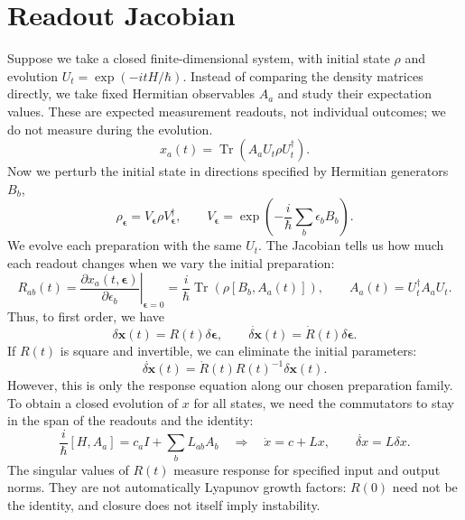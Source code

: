 \documentclass[11pt,a4paper]{article}
\newcommand{\Tr}{\operatorname{Tr}}
\begin{document}
\section*{Readout Jacobian}
Suppose we take a closed finite-dimensional system, with initial state $\rho$ and evolution $U_t=\exp(-itH/\hbar)$. Instead of comparing the density matrices directly, we take fixed Hermitian observables $A_a$ and study their expectation values. These are expected measurement readouts, not individual outcomes; we do not measure during the evolution.
\[x_a(t)=\Tr(A_aU_t\rho U_t^\dagger).\]
Now we perturb the initial state in directions specified by Hermitian generators $B_b$,
\[\rho_{\boldsymbol\epsilon}=V_{\boldsymbol\epsilon}\rho V_{\boldsymbol\epsilon}^\dagger,\qquad V_{\boldsymbol\epsilon}=\exp\!\left(-\frac{i}{\hbar}\sum_b\epsilon_bB_b\right).\]
We evolve each preparation with the same $U_t$. The Jacobian tells us how much each readout changes when we vary the initial preparation:
\[R_{ab}(t)=\left.\frac{\partial x_a(t,\boldsymbol\epsilon)}{\partial\epsilon_b}\right|_{\boldsymbol\epsilon=0}=\frac{i}{\hbar}\Tr(\rho[B_b,A_a(t)]),\qquad A_a(t)=U_t^\dagger A_aU_t.\]
Thus, to first order, we have
\[\delta\boldsymbol x(t)=R(t)\delta\boldsymbol\epsilon,\qquad\dot{\delta\boldsymbol x}(t)=\dot R(t)\delta\boldsymbol\epsilon.\]
If $R(t)$ is square and invertible, we can eliminate the initial parameters:
\[\dot{\delta\boldsymbol x}(t)=\dot R(t)R(t)^{-1}\delta\boldsymbol x(t).\]
However, this is only the response equation along our chosen preparation family. To obtain a closed evolution of $x$ for all states, we need the commutators to stay in the span of the readouts and the identity:
\[\frac{i}{\hbar}[H,A_a]=c_aI+\sum_bL_{ab}A_b\quad\Longrightarrow\quad\dot x=c+Lx,\qquad\dot{\delta x}=L\delta x.\]
The singular values of $R(t)$ measure response for specified input and output norms. They are not automatically Lyapunov growth factors: $R(0)$ need not be the identity, and closure does not itself imply instability.
\end{document}
